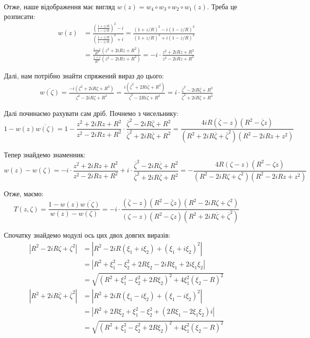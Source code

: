 \documentclass{hw_template}
\begin{document}
Отже, наше відображення має вигляд $w(z) = w_4 \circ w_3 \circ w_2 \circ w_1(z)$.  Треба це розписати:
\begin{align*}
    w(z) &= \frac{\left(\frac{1+z/R}{1-z/R}\right)^2-i}{\left(\frac{1+z/R}{1-z/R}\right)^2+i}
    = \frac{(1+z/R)^2-i(1-z/R)^2}{(1+z/R)^2+i(1-z/R)^2} \\
    &= \frac{\frac{1-i}{R^2}(z^2+2iRz+R^2)}{\frac{1+i}{R^2}(z^2-2iRz+R^2)} = -i \cdot \frac{z^2+2iRz+R^2}{z^2-2iRz+R^2}
\end{align*}

Далі, нам потрібно знайти спряжений вираз до цього:
\begin{align*}
    \overline{w(\zeta)} = \frac{\overline{-i(\zeta^2+2iR\zeta+R^2)}}{\overline{\zeta^2-2iR\zeta+R^2}} = \frac{i(\overline{\zeta}^2+2R\overline{i\zeta}+R^2)}{\overline{\zeta}^2-2R\overline{i\zeta}+R^2} = i \cdot \frac{\overline{\zeta}^2-2iR\overline{\zeta}+R^2}{\overline{\zeta}^2+2iR\overline{\zeta}+R^2}
\end{align*}

Далі починаємо рахувати сам дріб. Почнемо з чисельнику:
\begin{equation*}
    1-w(z)\overline{w(\zeta)} = 1 - \frac{z^2+2iRz+R^2}{z^2-2iRz+R^2} \cdot \frac{\overline{\zeta}^2-2iR\overline{\zeta}+R^2}{\overline{\zeta}^2+2iR\overline{\zeta}+R^2} = \frac{4iR(\overline{\zeta}-z)(R^2-\overline{\zeta}z)}{(R^2+2iR\overline{\zeta}+\overline{\zeta}^2)(R^2-2iRz+z^2)}
\end{equation*}

Тепер знайдемо знаменник:
\begin{equation*}
    w(z)-w(\zeta) = -i \cdot \frac{z^2+2iRz+R^2}{z^2-2iRz+R^2} + i \cdot \frac{\overline{\zeta}^2-2iR\overline{\zeta}+R^2}{\overline{\zeta}^2+2iR\overline{\zeta}+R^2} = -\frac{4R(\zeta-z)(R^2-\zeta z)}{(R^2-2iR\zeta+\zeta^2)(R^2-2iRz+z^2)}
\end{equation*}

Отже, маємо:
\begin{equation*}
    T(z,\zeta) = \frac{1-w(z)\overline{w(\zeta)}}{w(z)-w(\zeta)} = -i \cdot \frac{(\overline{\zeta}-z)(R^2-\overline{\zeta}z)(R^2-2iR\zeta+\zeta^2)}{(\zeta-z)(R^2-\zeta z)(R^2+2iR\overline{\zeta}+\overline{\zeta}^2)}
\end{equation*}

Спочатку знайдемо модулі ось цих двох довгих виразів:
\begin{align*}
    |R^2-2iR \zeta + \zeta^2| &= |R^2-2iR(\xi_1+i\xi_2)+(\xi_1+i\xi_2)^2| \\
    &= |R^2+\xi_1^2-\xi_2^2+2R\xi_2 - 2iR\xi_1 + 2i\xi_1\xi_2| \\
    &= \sqrt{(R^2+\xi_1^2-\xi_2^2+2R\xi_2)^2 + 4\xi_1^2(\xi_2-R)^2} 
\end{align*}
\begin{align*}
    |R^2+2iR\overline{\zeta}+\overline{\zeta}^2| &= |R^2+2iR(\xi_1-i\xi_2)+(\xi_1-i\xi_2)^2| \\
    &= |R^2+2R\xi_2+\xi_1^2-\xi_2^2 + (2R\xi_1-2\xi_1\xi_2)i| \\
    &= \sqrt{(R^2+\xi_1^2-\xi_2^2+2R\xi_2)^2 + 4\xi_1^2(\xi_2-R)^2} 
\end{align*}
\end{document}
